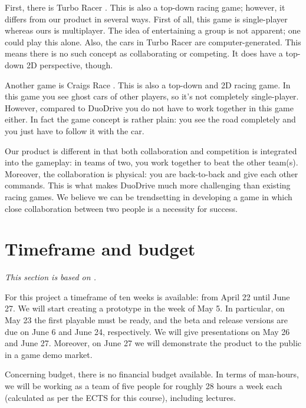 \documentclass[11pt,twoside,a4paper]{article}
\begin{document}
First, there is Turbo Racer \cite{turboracer}. This is also a top-down racing game; however, it differs from our product in several ways. First of all, this game is single-player whereas ours is multiplayer. The idea of entertaining a group is not apparent; one could play this alone. Also, the cars in Turbo Racer are computer-generated. This means there is no such concept as collaborating or competing. It does have a top-down 2D perspective, though.

Another game is Craigs Race \cite{craigsrace1} \cite{craigsrace2}. This is also a top-down and 2D racing game. In this game you see ghost cars of other players, so it's not completely single-player. However, compared to DuoDrive you do not have to work together in this game either. In fact the game concept is rather plain: you see the road completely and you just have to follow it with the car.

Our product is different in that both collaboration and competition is integrated into the gameplay: in teams of two, you work together to beat the other team(s). Moreover, the collaboration is physical: you are back-to-back and give each other commands. This is what makes DuoDrive much more challenging than existing racing games. We believe we can be trendsetting in developing a game in which close collaboration between two people is a necessity for success.


\section{Timeframe and budget}
{\itshape This section is based on \cite{gamesplanning}.}

For this project a timeframe of ten weeks is available: from April 22 until June 27. We will start creating a prototype in the week of May 5. In particular, on May 23 the first playable must be ready, and the beta and release versions are due on June 6 and June 24, respectively. We will give presentations on May 26 and June 27. Moreover, on June 27 we will demonstrate the product to the public in a game demo market.

Concerning budget, there is no financial budget available. In terms of man-hours, we will be working as a team of five people for roughly 28 hours a week each (calculated as per the ECTS for this course), including lectures.
\end{document}
